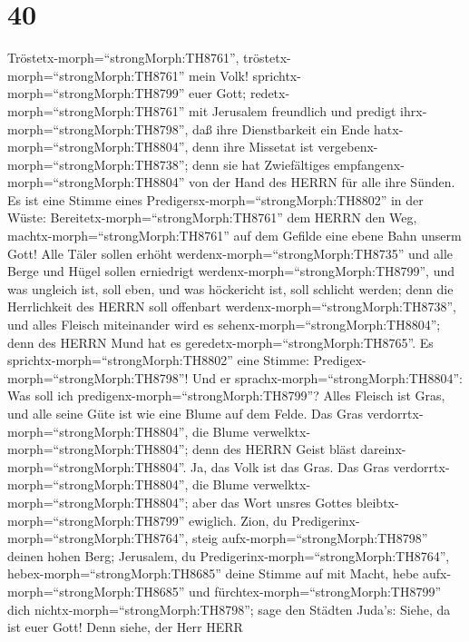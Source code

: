 \hypertarget{section-39}{%
\section{40}\label{section-39}}

 Tröstetx-morph=``strongMorph:TH8761'',
tröstetx-morph=``strongMorph:TH8761'' mein Volk!
sprichtx-morph=``strongMorph:TH8799'' euer Gott; 
redetx-morph=``strongMorph:TH8761'' mit Jerusalem freundlich und predigt
ihrx-morph=``strongMorph:TH8798'', daß ihre Dienstbarkeit ein Ende
hatx-morph=``strongMorph:TH8804'', denn ihre Missetat ist
vergebenx-morph=``strongMorph:TH8738''; denn sie hat Zwiefältiges
empfangenx-morph=``strongMorph:TH8804'' von der Hand des HERRN für alle
ihre Sünden.  Es ist eine Stimme eines
Predigersx-morph=``strongMorph:TH8802'' in der Wüste:
Bereitetx-morph=``strongMorph:TH8761'' dem HERRN den Weg,
machtx-morph=``strongMorph:TH8761'' auf dem Gefilde eine ebene Bahn
unserm Gott!  Alle Täler sollen erhöht
werdenx-morph=``strongMorph:TH8735'' und alle Berge und Hügel sollen
erniedrigt werdenx-morph=``strongMorph:TH8799'', und was ungleich ist,
soll eben, und was höckericht ist, soll schlicht werden; 
denn die Herrlichkeit des HERRN soll offenbart
werdenx-morph=``strongMorph:TH8738'', und alles Fleisch miteinander wird
es sehenx-morph=``strongMorph:TH8804''; denn des HERRN Mund hat es
geredetx-morph=``strongMorph:TH8765''.  Es
sprichtx-morph=``strongMorph:TH8802'' eine Stimme:
Predigex-morph=``strongMorph:TH8798''! Und er
sprachx-morph=``strongMorph:TH8804'': Was soll ich
predigenx-morph=``strongMorph:TH8799''? Alles Fleisch ist Gras, und alle
seine Güte ist wie eine Blume auf dem Felde.  Das Gras
verdorrtx-morph=``strongMorph:TH8804'', die Blume
verwelktx-morph=``strongMorph:TH8804''; denn des HERRN Geist bläst
dareinx-morph=``strongMorph:TH8804''. Ja, das Volk ist das Gras.
 Das Gras verdorrtx-morph=``strongMorph:TH8804'', die Blume
verwelktx-morph=``strongMorph:TH8804''; aber das Wort unsres Gottes
bleibtx-morph=``strongMorph:TH8799'' ewiglich.  Zion, du
Predigerinx-morph=``strongMorph:TH8764'', steig
aufx-morph=``strongMorph:TH8798'' deinen hohen Berg; Jerusalem, du
Predigerinx-morph=``strongMorph:TH8764'',
hebex-morph=``strongMorph:TH8685'' deine Stimme auf mit Macht, hebe
aufx-morph=``strongMorph:TH8685'' und
fürchtex-morph=``strongMorph:TH8799'' dich
nichtx-morph=``strongMorph:TH8798''; sage den Städten Juda's: Siehe, da
ist euer Gott!  Denn siehe, der Herr HERR
